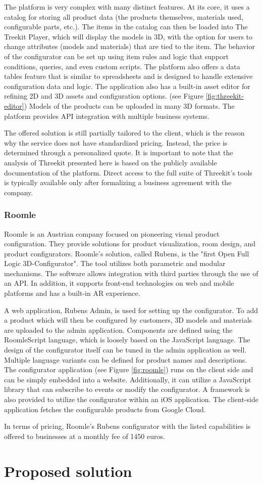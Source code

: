 The platform is very complex with many distinct features. At its core, it uses a catalog for storing all product data (the products themselves, materials used, configurable parts, etc.). The items in the catalog can then be loaded into The Treekit Player, which will display the models in 3D, with the option for users to change attributes (models and materials) that are tied to the item. The behavior of the configurator can be set up using item rules and logic that support conditions, queries, and even custom scripts. The platform also offers a data tables feature that is similar to spreadsheets and is designed to handle extensive configuration data and logic. The application also has a built-in asset editor for refining 2D and 3D assets and configuration options. (see Figure \ref{fig:threekit-editor}) Models of the products can be uploaded in many 3D formats. The platform provides API integration with multiple business systems. \cite{ThreeKitPlatformDocumentation}

The offered solution is still partially tailored to the client, which is the reason why the service does not have standardized pricing. Instead, the price is determined through a personalized quote. It is important to note that the analysis of Threekit presented here is based on the publicly available documentation of the platform. Direct access to the full suite of Threekit's tools is typically available only after formalizing a business agreement with the company.

\subsubsection{Roomle}

Roomle is an Austrian company focused on pioneering visual product configuration. They provide solutions for product visualization, room design, and product configurators. Roomle's solution, called Rubens, is the "first Open Full Logic 3D-Configurator". The tool utilizes both parametric and modular mechanisms. The software allows integration with third parties through the use of an API. In addition, it supports front-end technologies on web and mobile platforms and has a built-in AR experience. \cite{RoomleAbout}

A web application, Rubens Admin, is used for setting up the configurator. To add a product which will then be configured by customers, 3D models and materials are uploaded to the admin application. Components are defined using the RoomleScript language, which is loosely based on the JavaScript language. The design of the configurator itself can be tuned in the admin application as well. Multiple language variants can be defined for product names and descriptions. The configurator application (see Figure \ref{fig:roomle}) runs on the client side and can be simply embedded into a website. Additionally, it can utilize a JavaScript library that can subscribe to events or modify the configurator. A framework is also provided to utilize the configurator within an iOS application. The client-side application fetches the configurable products from Google Cloud. \cite{RoomleDocumentation}

In terms of pricing, Roomle's Rubens configurator with the listed capabilities is offered to businesses at a monthly fee of 1450 euros. \cite{RoomleFullLogic}

\section{Proposed solution}